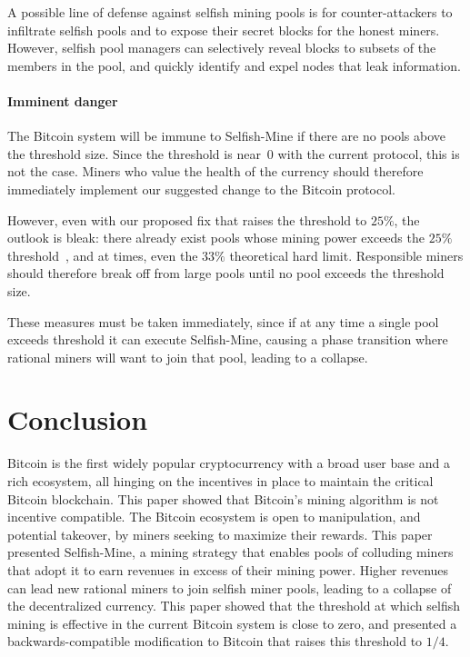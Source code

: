 \documentclass[letterpaper]{llncs}
\newcommand{\negspace}{\vspace{-0.5\baselineskip}}
\begin{document}
A possible line of defense against selfish mining pools is for counter-attackers to infiltrate selfish pools and to expose their secret blocks for the honest miners. 
However, selfish pool managers can selectively reveal blocks to subsets of the members in the pool, and quickly identify and expel nodes that leak information. 


\paragraph{Imminent danger} 

The Bitcoin system will be immune to Selfish-Mine if there are no pools above the threshold size. Since the threshold is near~0 with the current protocol, this is not the case. 
Miners who value the health of the currency should therefore immediately implement our suggested change to the Bitcoin protocol. 

However, even with our proposed fix that raises the threshold to $25\%$, the outlook is bleak: there already exist pools whose mining power exceeds the $25\%$ threshold~\cite{poolWatch2013poolStats}, and at times, even the $33\%$ theoretical hard limit. 
Responsible miners should therefore break off from large pools until no pool exceeds the threshold size.

These measures must be taken immediately, since if at any time a single pool exceeds threshold it can execute Selfish-Mine, causing a phase transition where rational miners will want to join that pool, leading to a collapse. 



    \section{Conclusion} \label{sec:conclusion}
    \negspace

Bitcoin is the first widely popular cryptocurrency with a broad user base and a rich ecosystem, all hinging on the incentives in place to maintain the critical Bitcoin blockchain.
This paper showed that Bitcoin's mining algorithm is not incentive compatible. The Bitcoin ecosystem is open to manipulation, and potential takeover, by miners seeking to maximize their rewards. This paper
presented Selfish-Mine, a mining strategy that enables pools of colluding miners that adopt it to earn revenues in excess of their mining power. Higher revenues can lead new rational miners to join
selfish miner pools, leading to a collapse of the decentralized currency. This paper showed that the threshold at which selfish mining is effective in the current Bitcoin system is close to zero, and presented
a backwards-compatible modification to Bitcoin that raises this threshold to $1/4$. 
\end{document}
